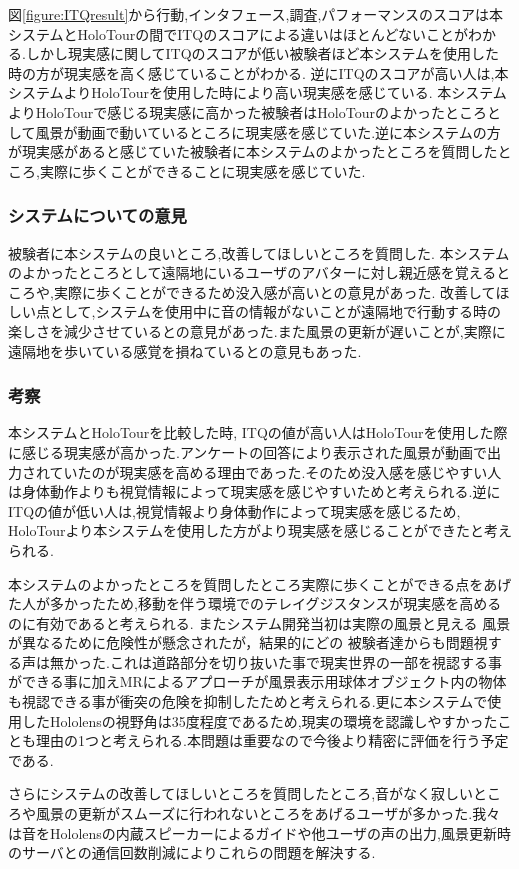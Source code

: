 図\ref{figure:ITQresult}から行動,インタフェース,調査,パフォーマンスのスコアは本システムとHoloTourの間でITQのスコアによる違いはほとんどないことがわかる.しかし現実感に関してITQのスコアが低い被験者ほど本システムを使用した時の方が現実感を高く感じていることがわかる.
逆にITQのスコアが高い人は,本システムよりHoloTourを使用した時により高い現実感を感じている.
本システムよりHoloTourで感じる現実感に高かった被験者はHoloTourのよかったところとして風景が動画で動いているところに現実感を感じていた.逆に本システムの方が現実感があると感じていた被験者に本システムのよかったところを質問したところ,実際に歩くことができることに現実感を感じていた.
\subsubsection{システムについての意見}
被験者に本システムの良いところ,改善してほしいところを質問した.
本システムのよかったところとして遠隔地にいるユーザのアバターに対し親近感を覚えるところや,実際に歩くことができるため没入感が高いとの意見があった.
改善してほしい点として,システムを使用中に音の情報がないことが遠隔地で行動する時の楽しさを減少させているとの意見があった.また風景の更新が遅いことが,実際に遠隔地を歩いている感覚を損ねているとの意見もあった.
\clearpage
\subsubsection{考察}
本システムとHoloTourを比較した時, ITQの値が高い人はHoloTourを使用した際に感じる現実感が高かった.アンケートの回答により表示された風景が動画で出力されていたのが現実感を高める理由であった.そのため没入感を感じやすい人は身体動作よりも視覚情報によって現実感を感じやすいためと考えられる.逆にITQの値が低い人は,視覚情報より身体動作によって現実感を感じるため, HoloTourより本システムを使用した方がより現実感を感じることができたと考えられる.

本システムのよかったところを質問したところ実際に歩くことができる点をあげた人が多かったため,移動を伴う環境でのテレイグジスタンスが現実感を高めるのに有効であると考えられる.
またシステム開発当初は実際の風景と見える 風景が異なるために危険性が懸念されたが，結果的にどの 被験者達からも問題視する声は無かった.これは道路部分を切り抜いた事で現実世界の一部を視認する事ができる事に加えMRによるアプローチが風景表示用球体オブジェクト内の物体も視認できる事が衝突の危険を抑制したためと考えられる.更に本システムで使用したHololensの視野角は35度程度であるため,現実の環境を認識しやすかったことも理由の1つと考えられる.本問題は重要なので今後より精密に評価を行う予定である.

さらにシステムの改善してほしいところを質問したところ,音がなく寂しいところや風景の更新がスムーズに行われないところをあげるユーザが多かった.我々は音をHololensの内蔵スピーカーによるガイドや他ユーザの声の出力,風景更新時のサーバとの通信回数削減によりこれらの問題を解決する.
